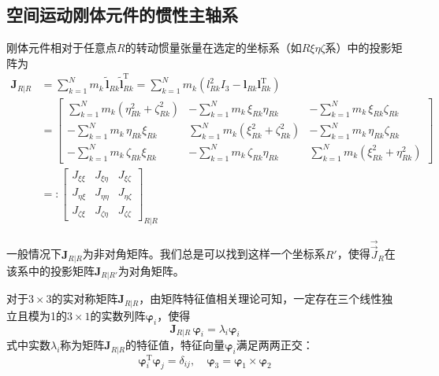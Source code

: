 \subsection*{空间运动刚体元件的惯性主轴系}

刚体元件相对于任意点$R$的转动惯量张量在选定的坐标系（如$R\xi\eta\zeta$系）中的投影矩阵为
\begin{align}
\boldsymbol{J}_{R|R} &= \sum_{k=1}^{N} m_k\,\tilde{\boldsymbol{l}}_{Rk}\tilde{\boldsymbol{l}}_{Rk}^{\mathrm{T}}
 = \sum_{k=1}^{N} m_k\left(l_{Rk}^2 I_3 - \boldsymbol{l}_{Rk}\boldsymbol{l}_{Rk}^{\mathrm{T}}\right) \nonumber\\
&= \begin{bmatrix}
\displaystyle\sum_{k=1}^{N} m_k(\eta_{Rk}^2 + \zeta_{Rk}^2)  & -\displaystyle\sum_{k=1}^{N} m_k\,\xi_{Rk}\eta_{Rk} & -\displaystyle\sum_{k=1}^{N} m_k\,\xi_{Rk}\zeta_{Rk} \\[12pt]
-\displaystyle\sum_{k=1}^{N} m_k\,\eta_{Rk}\xi_{Rk} & \displaystyle\sum_{k=1}^{N} m_k(\xi_{Rk}^2 + \zeta_{Rk}^2)  & -\displaystyle\sum_{k=1}^{N} m_k\,\eta_{Rk}\zeta_{Rk} \\[12pt]
-\displaystyle\sum_{k=1}^{N} m_k\,\zeta_{Rk}\xi_{Rk} & -\displaystyle\sum_{k=1}^{N} m_k\,\zeta_{Rk}\eta_{Rk} & \displaystyle\sum_{k=1}^{N} m_k(\xi_{Rk}^2 + \eta_{Rk}^2)
\end{bmatrix} \nonumber\\
&=:
\begin{bmatrix}
J_{\xi\xi} & J_{\xi\eta} & J_{\xi\zeta} \\[2pt]
J_{\eta\xi} & J_{\eta\eta} & J_{\eta\zeta} \\[2pt]
J_{\zeta\xi} & J_{\zeta\eta} & J_{\zeta\zeta}
\end{bmatrix}_{R|R}
\label{eq:8.15}
\end{align}

一般情况下$\boldsymbol{J}_{R|R}$为非对角矩阵。我们总是可以找到这样一个坐标系$R'$，使得$\vec{\vec{J}}_R$在该系中的投影矩阵$\boldsymbol{J}_{R|R'}$为对角矩阵。

对于$3\times 3$的实对称矩阵$\boldsymbol{J}_{R|R}$，由矩阵特征值相关理论可知，一定存在三个线性独立且模为1的$3\times 1$的实数列阵$\boldsymbol{\varphi}_i$，使得
\begin{equation}
\boldsymbol{J}_{R|R}\,\boldsymbol{\varphi}_i = \lambda_i\boldsymbol{\varphi}_i
\label{eq:8.16}
\end{equation}
式中实数$\lambda_i$称为矩阵$\boldsymbol{J}_{R|R}$的特征值，特征向量$\boldsymbol{\varphi}_i$满足两两正交：
\begin{equation}
\boldsymbol{\varphi}_i^{\mathrm{T}}\boldsymbol{\varphi}_j = \delta_{ij}, \quad
\boldsymbol{\varphi}_3 = \boldsymbol{\varphi}_1 \times \boldsymbol{\varphi}_2
\end{equation}

